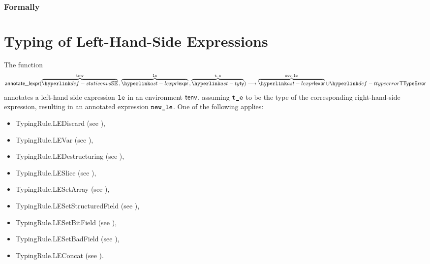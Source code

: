 \subsection{Formally}

\chapter{Typing of Left-Hand-Side Expressions \label{chap:typinglexpr}}
\hypertarget{def-annotatelexpr}{}
The function
\[
  \annotatelexpr{
    \overname{\staticenvs}{\tenv} \aslsep
    \overname{\lexpr}{\vle} \aslsep
    \overname{\ty}{\vte}} \aslto
    \overname{\lexpr}{\newle} \cup \TTypeError
\]
annotates a left-hand side expression $\texttt{le}$ in an environment $\textsf{tenv}$, assuming $\texttt{t\_e}$
to be the type of the corresponding right-hand-side expression,
resulting in an annotated expression $\texttt{new\_le}$.
\ProseOtherwiseTypeError
One of the following applies:
\begin{itemize}
\item TypingRule.LEDiscard (see ),
\item TypingRule.LEVar (see ),
\item TypingRule.LEDestructuring (see ),
\item TypingRule.LESlice (see ),
\item TypingRule.LESetArray (see ),
\item TypingRule.LESetStructuredField (see ),
\item TypingRule.LESetBitField (see ),
\item TypingRule.LESetBadField (see ),
\item TypingRule.LEConcat (see ).
\end{itemize}

